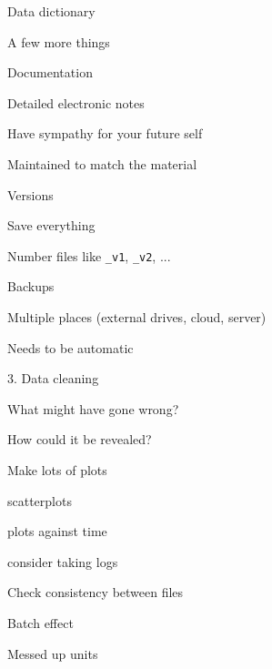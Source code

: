 \documentclass[aspectratio=169,12pt,t]{beamer}
\begin{document}
\begin{frame}[c]{Data dictionary}




\end{frame}




\begin{frame}[c]{A few more things}

  \bbi
\item Documentation
  \bi
\item Detailed electronic notes
\item Have sympathy for your future self
\item Maintained to match the material
  \ei
\item Versions
  \bi
  \item Save everything
  \item Number files like {\tt \_v1}, {\tt \_v2}, ...
  \ei
\item Backups
  \bi
\item Multiple places (external drives, cloud, server)
\item Needs to be automatic
  \ei
  \ei

\end{frame}




\begin{frame}[c]{3. Data cleaning}

  \bbi
\item What might have gone wrong?
\item How could it be revealed?
\item Make lots of plots
  \bi
\item scatterplots
\item plots against time
\item consider taking logs
  \ei
\item Check consistency between files
  \ei

\end{frame}


\begin{frame}[c]{Batch effect}




\end{frame}



\begin{frame}[c]{Messed up units}



\end{frame}
\end{document}

